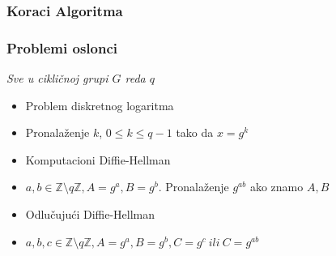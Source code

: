 \documentclass[14pt]{beamer}
\begin{document}
\begin{frame}[fragile]\frametitle{Koraci Algoritma}
    \begin{table}[h]
        \begin{center}
        \caption{Šematski prikaz razmena promenljivih tokom algoritma}
        \end{center}
    \end{table}

\end{frame}

\begin{frame}[fragile]\frametitle{Problemi oslonci}
    \small
    \emph{Sve u cikličnoj grupi $G$ reda $q$}
	\begin{itemize}	
		\item Problem diskretnog logaritma
        \item[] Pronalaženje $k$, $0 \le k \le q - 1$ tako da $x = g^k$ %
        \item Komputacioni Diffie-Hellman
        \item[] $a, b \in \mathbb{Z}\setminus q\mathbb{Z}, A = g^a, B = g^b$. Pronalaženje $g^{ab}$ ako znamo $A,B$ %
        \item Odlučujući Diffie-Hellman
        \item[] $a, b, c \in \mathbb{Z}\setminus q\mathbb{Z}, A=g^a, B=g^b, C=g^c\ ili\ C=g^{ab}$
	\end{itemize}
\end{frame}
\end{document}
